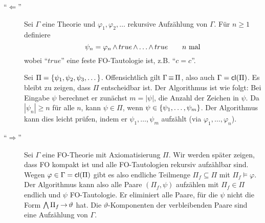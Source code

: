 \begin{description}
  \item[\enquote{$\Leftarrow$}]
  Sei $\Gamma$ eine Theorie und $\varphi_1, \varphi_2, \ldots$ rekursive
  Aufzählung von $\Gamma$.
  Für $n\geq1$ definiere
  \[
    \psi_n = \varphi_n \operatorname{\wedge} true \operatorname{\wedge} \dots \operatorname{\wedge} true \qquad \text{$n$ mal}
  \]
  wobei \enquote{$true$} eine feste FO-Tautologie ist, z.B. \enquote{$c=c$}.
  
  Sei $\Pi=\left\{\psi_1,\psi_2,\psi_3,\dots\right\}$. Offensichtlich gilt
  $\Gamma\operatorname{\equiv}\Pi$, also auch $\Gamma=\operatorname{\text{\textsf{cl}}}(\Pi)$. Es bleibt zu zeigen, dass $\Pi$
  entscheidbar ist. Der Algorithmus ist wie folgt: Bei Eingabe $\psi$
  berechnet er zunächst $m=|\psi|$, die Anzahl der Zeichen in $\psi$. Da
  $|\psi_n| \geq n$ für alle $n$, kann $\psi\in\Pi$, wenn
  $\psi\in\left\{\psi_1,\dots,\psi_m\right\}$. Der Algorithmus kann dies leicht prüfen,
  indem er $\psi_1,\dots,\psi_m$ aufzählt (via $\varphi_1,\dots,\varphi_n$).
    
  \item[\enquote{$\Rightarrow$}]
  Sei $\Gamma$ eine FO-Theorie mit Axiomatisierung $\Pi$. Wir werden später
  zeigen, dass FO kompakt ist und alle FO-Tautologien rekursiv aufzählbar
  sind. Wegen $\varphi\in\Gamma=\operatorname{\text{\textsf{cl}}}(\Pi)$ gibt es also endliche Teilmenge
  $\Pi_f\subseteq\Pi$ mit $\Pi_f\models\varphi$. Der Algorithmus kann also
  alle Paare $(\Pi_f,\psi)$ aufzählen mit $\Pi_f\in\Pi$ endlich und $\psi$
  FO-Tautologie. Er eliminiert alle Paare, für die $\psi$ nicht die Form
  $\operatorname*{\bigwedge}\Pi_f\operatorname{\rightarrow}\vartheta$ hat. Die $\vartheta$-Komponenten der verbleibenden Paare
  sind eine Aufzählung von $\Gamma$.
\end{description}

